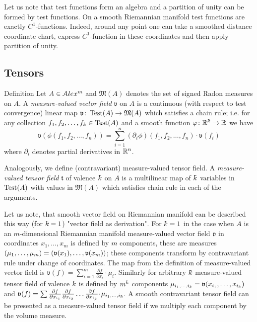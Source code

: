 Let us note that
test functions form an algebra and a
partition of unity can be formed by test functions.
On a smooth Riemannian manifold test functions
are exactly $C^1$-functions.
Indeed, around any point one can take a
smoothed distance 
coordinate chart, express $C^1$-function in these 
coordinates and then apply partition of unity. 
 
 
\subsection{Tensors}


\begin{rdef} {Definition}\label{def:mestens}
Let $A\in \mathcal{A}lex^m$ and $\mathfrak M(A)$
denotes the set of signed Radon measures on $A$.
A \emph{measure-valued vector field} $\mathfrak{v}$  on $A$
is a  continuous (with respect to test convergence) linear map
$\mathfrak{v}\colon\operatorname{Test}(A)\to \mathfrak M(A)$ which satisfies a
chain rule;
i.e. for any collection  $f_1,f_2,\dots,f_\kay \in \Test(A)$
and a smooth function $\phi\:\RR^\kay\to\RR$ we have
$$\mathfrak{v}(\phi(f_1,f_2,\dots,f_n))
=
\sum_{i=1}^n (\partial_i\phi)(f_1,f_2,\dots,f_n)\cdot\mathfrak{v}(f_i)$$
where $\partial_i$ denotes partial derivatives in $\mathbb{R}^n$.

Analogously, we define (contravariant) measure-valued tensor field.
A \emph{measure-valued tensor field} $\mathfrak{t}$ of valence $\kay$ on $A$ is a multilinear map of $\kay$ variables in $\operatorname{Test}(A)$ with values in $\mathfrak M(A)$ which satisfies chain rule in each of the arguments.
\end{rdef}

Let us note, that smooth vector field on Riemannian manifold can be described this way (for
$\kay=1$) "vector field as derivation".
For $\kay=1$ in the case when $A$ is an $m$-dimensional Riemannian manifold measure-valued vector field $\mathfrak{v}$  in coordinates
 $x_1,\dots,x_m$
is defined by $m$ components, these are measures $(\mu_1,\dots, \mu_{m})=(\mathfrak{v}(x_1),\dots,\mathfrak{v}(x_m))$;
these components transform by contravariant rule under change
 of coordinates. The map from the definition of measure-valued vector field is
 $\mathfrak{v}(f)=\sum_{i=1}^m\frac{\partial f}{\partial x_i}\cdot \mu_i$.
 Similarly for arbitrary $\kay$ measure-valued tensor field of valence $\kay$ 
 is defined by $m^\kay$ components 
 $\mu_{{i_1},\dots,{i_\kay}}=\vv(x_{i_1},\dots,x_{i_\kay})$
 and
 $\mathfrak{v}(f)=\sum
 \frac{\partial f}{\partial x_{i_1}}\frac{\partial f}{\partial x_{i_2}}\dots\frac{\partial f}{\partial x_{i_k}}
 \cdot \mu_{{i_1},\dots,{i_\kay}}$.
A smooth contravariant tensor field can be presented as a measure-valued tensor field if we multiply each component by the volume measure.

